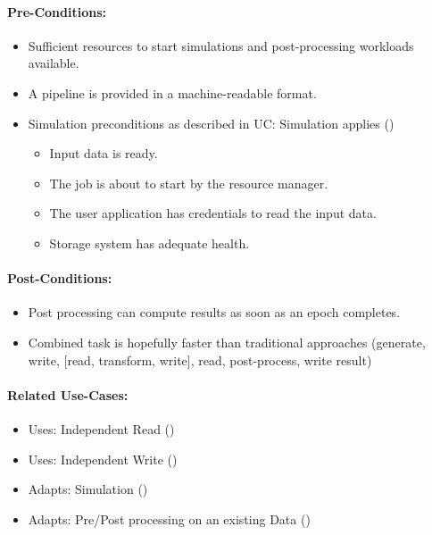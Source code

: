 \paragraph{Pre-Conditions:}
\begin{itemize}
	\item Sufficient resources to start simulations and post-processing workloads available.
	\item A pipeline is provided in a machine-readable format.
	\item Simulation preconditions as described in UC: Simulation applies ()
	\begin{itemize}
		\item Input data is ready.
		\item The job is about to start by the resource manager.
		\item The user application has credentials to read the input data.
		\item Storage system has adequate health.
	\end{itemize}

\end{itemize}


\paragraph{Post-Conditions:}
\begin{itemize}
	\item Post processing can compute results as soon as an epoch completes.
	\item Combined task is hopefully faster than traditional approaches (generate, write, [read, transform, write], read, post-process, write result)
\end{itemize}


\paragraph{Related Use-Cases:}
\begin{itemize}
	\item Uses: Independent Read ()
	\item Uses: Independent Write ()
	\item Adapts: Simulation ()
	\item Adapts: Pre/Post processing on an existing Data ()
\end{itemize}


